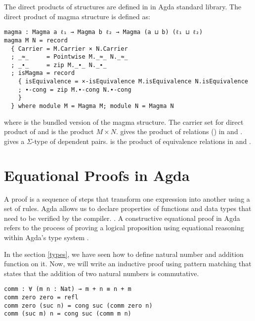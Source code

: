The direct products of structures are defined in
 in Agda standard library. The direct
product of magma structure is defined as:

\begin{verbatim}
magma : Magma a ℓ₁ → Magma b ℓ₂ → Magma (a ⊔ b) (ℓ₁ ⊔ ℓ₂)
magma M N = record
  { Carrier = M.Carrier × N.Carrier
  ; _≈_     = Pointwise M._≈_ N._≈_
  ; _∙_     = zip M._∙_ N._∙_
  ; isMagma = record
    { isEquivalence = ×-isEquivalence M.isEquivalence N.isEquivalence
    ; ∙-cong = zip M.∙-cong N.∙-cong
    }
  } where module M = Magma M; module N = Magma N
\end{verbatim}

where  is the bundled version of the magma structure. The carrier
set for direct product of  and  is the product $M \times N$.
 gives the product of relations () in 
and .  gives a $\Sigma$-type of dependent pairs.
 is the product of equivalence relations in 
and .

\section{Equational Proofs in Agda}
A proof is a sequence of steps that transform one expression into another using
a set of rules. Agda allows us to declare properties of functions and data types
that need to be verified by the compiler. \cite{kidney2020finiteness}.  A
constructive equational proof in Agda refers to the process of proving a logical
proposition using equational reasoning within Agda's type system
\cite{murray2022constructive}. 

In the section \ref{types}, we have seen how to define natural number and addition
function on it. Now, we will write an inductive proof using pattern matching
that states that the addition of two natural numbers is commutative.

\begin{verbatim}
comm : ∀ (m n : Nat) → m + n ≡ n + m
comm zero zero = refl
comm zero (suc n) = cong suc (comm zero n)
comm (suc m) n = cong suc (comm m n)
\end{verbatim}

